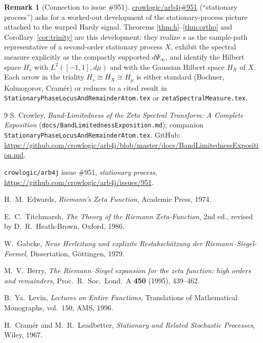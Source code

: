 \documentclass[11pt]{article}
\theoremstyle{definition}
\newtheorem{remark}[theorem]{Remark}
\begin{document}
\begin{remark}[Connection to issue \#951]
\href{https://github.com/crowlogic/arb4j/issues/951}{crowlogic/arb4j\#951}
(``stationary process'') asks for a worked-out development of the
stationary-process picture attached to the warped Hardy signal. Theorems
\ref{thm:h}--\ref{thm:ortho} and Corollary~\ref{cor:trinity} are this
development: they realize $s$ as the sample-path representative of a
second-order stationary process $X$, exhibit the spectral measure
explicitly as the compactly supported $d\Psi_{\infty}$, and identify the
Hilbert space $H_{s}$ with $L^{2}([-1,1],d\mu)$ and with the Gaussian
Hilbert space $H_{X}$ of $X$. Each arrow in the triality
$H_{s}\cong H_{X}\cong H_{\mu}$ is either standard (Bochner,
Kolmogorov, Cramér) or reduces to a cited result in
\texttt{StationaryPhaseLocusAndRemainderAtom.tex} or
\texttt{zetaSpectralMeasure.tex}.
\end{remark}

\begin{thebibliography}{9}
S. Crowley,
\emph{Band-Limitedness of the Zeta Spectral Transform: A Complete
Exposition} (\texttt{docs/BandLimitednessExposition.md});
companion \texttt{StationaryPhaseLocusAndRemainderAtom.tex}. GitHub:
\url{https://github.com/crowlogic/arb4j/blob/master/docs/BandLimitednessExposition.md}.

\texttt{crowlogic/arb4j} issue \#951, \emph{stationary process},
\url{https://github.com/crowlogic/arb4j/issues/951}.

H.~M.~Edwards, \emph{Riemann's Zeta Function}, Academic Press, 1974.

E.~C.~Titchmarsh, \emph{The Theory of the Riemann Zeta-Function},
2nd ed., revised by D.~R.~Heath-Brown, Oxford, 1986.

W.~Gabcke, \emph{Neue Herleitung und explizite Restabsch\"atzung der
Riemann--Siegel-Formel}, Dissertation, G\"ottingen, 1979.

M.~V.~Berry, \emph{The Riemann--Siegel expansion for the zeta function:
high orders and remainders}, Proc.\ R.\ Soc.\ Lond.\ A \textbf{450}
(1995), 439--462.

B.~Ya.~Levin, \emph{Lectures on Entire Functions}, Translations of
Mathematical Monographs, vol.~150, AMS, 1996.

H.~Cram\'er and M.~R.~Leadbetter, \emph{Stationary and Related Stochastic
Processes}, Wiley, 1967.
\end{thebibliography}
\end{document}
